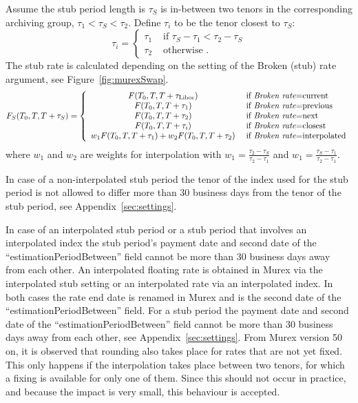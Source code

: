 \documentclass[]{pmv_report} %
\begin{document}
Assume the stub period length is $\tau_S$ is in-between two tenors in the corresponding archiving group, $\tau_1<\tau_S<\tau_2$. Define $\tau_i$ to be the tenor closest to
$\tau_S$:
\begin{equation*}
 \tau_i=\left\{
 \begin{array}{cl}
   \tau_1 & \text{ if } \tau_S-\tau_1<\tau_2-\tau_S\\
   \tau_2 & \text{ otherwise }.
   \end{array}
  \right.
\end{equation*}
The stub rate is calculated depending on the setting of the Broken (stub) rate argument, see Figure~\ref{fig:murexSwap}.
\begin{equation}
  F_S(T_0,T,T+\tau_S)=
  \left\{
  \begin{array}{cl}
    F(T_0,T,T+\tau_{\text{Libor}}) & \text{ if \textit{Broken rate}=current} \\
    F(T_0,T,T+\tau_{1}) & \text{ if \textit{Broken rate}=previous} \\
    F(T_0,T,T+\tau_{2}) & \text{ if \textit{Broken rate}=next} \\
    F(T_0,T,T+\tau_{i}) & \text{ if \textit{Broken rate}=closest} \\
    w_1 F(T_0,T,T+\tau_{1}) +w_2 F(T_0,T,T+\tau_{2}) & \text{ if \textit{Broken rate}=interpolated} \\
    \end{array}
  \right.
\end{equation}
where $w_1$ and $w_2$ are weights for interpolation with $w_1=\frac{\tau_2-\tau_S}{\tau_2-\tau_1}$ and $w_1=\frac{\tau_S-\tau_1}{\tau_2-\tau_1}$.

In case of a non-interpolated stub period the tenor of the index used for the stub period is not allowed to differ more than 30 business days from the tenor of the stub period, see Appendix~\ref{sec:settings}.

In case of an interpolated stub period or a stub period that involves an interpolated index the stub period's payment date and second date of the ``estimationPeriodBetween'' field cannot be more than 30 business days away from each other.
An interpolated floating rate is obtained in Murex via the interpolated stub setting or an interpolated rate via an interpolated index.
In both cases the rate end date is renamed in Murex and is the second date of the ``estimationPeriodBetween'' field.
For a stub period the payment date and second date of the “estimationPeriodBetween” field cannot be more than 30 business days away from each other, see Appendix~\ref{sec:settings}.
From Murex version 50 on, it is observed that rounding also takes place for rates that are not yet fixed.
This only happens if the interpolation takes place between two tenors, for which a fixing is available for only one of them.
Since this should not occur in practice, and because the impact is very small, this behaviour is accepted.
\end{document}
